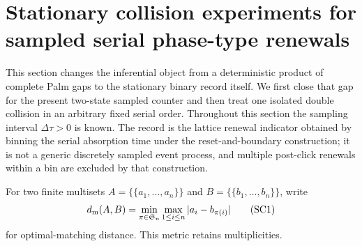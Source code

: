 \section{Stationary collision experiments for sampled serial phase-type renewals}
\label{sec:stationary-serial-collision-main}

This section changes the inferential object from a deterministic product of
complete Palm gaps to the stationary binary record itself.  We first close
that gap for the present two-state sampled counter and then treat one isolated
double collision in an arbitrary fixed serial order.  Throughout this section
the sampling interval \(\Delta\tau>0\) is known.  The record is the lattice
renewal indicator obtained by binning the serial absorption time under the
reset-and-boundary construction; it is not a generic discretely sampled event
process, and multiple post-click renewals within a bin are excluded by that
construction.

For two finite multisets \(A=\{\!\{a_1,\ldots,a_n\}\!\}\) and
\(B=\{\!\{b_1,\ldots,b_n\}\!\}\), write
\[
 d_{\rm m}(A,B)=\min_{\pi\in\mathfrak S_n}
       \max_{1\le i\le n}|a_i-b_{\pi(i)}|
\tag{SC1}
\]
for optimal-matching distance.  This metric retains multiplicities.

